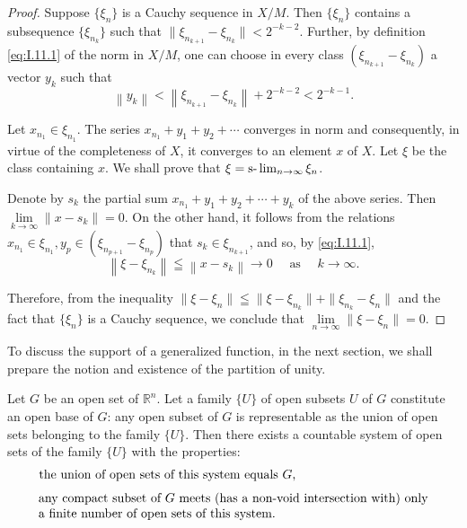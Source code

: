 \begin{proof}
 Suppose $\{\xi_n\}$ is a Cauchy sequence in $X / M$. Then $\{\xi_n\}$ contains a subsequence $\{\xi_{n_{k}}\}$ such that $\| \xi_{n_{k+1}}- \xi_{n_{k}} \| < 2^{-k-2}$. Further, by definition \eqref{eq:I.11.1} of the norm in $X / M$, one can choose in every class $(\xi_{n_{k+1}}- \xi_{n_{k}})$ a vector $y_k$ such that 
\[
\left\| y_{k} \right\| < \left\| \xi_ {n_{k+1}}- \xi_ {n_{k}} \right\| + 2 ^{-k-2} < 2 ^{-k-1}. \]

Let $x_{n_1} \in \xi_{n_1}$. The series $x_{n_1} + y_1 + y_2 + \cdots$ converges in norm and consequently, in virtue of the completeness of $X$, it converges to an element $x$ of $X$. Let $\xi$ be the class containing $x$. We shall prove that $\xi = \text{s-}\lim\nolimits_{n \to \infty} \xi_n$. 


Denote by $s_{k}$ the partial sum $x_{n_{1}} + y_{1} + y_{2} + \cdots + y_{k}$ of the above series. Then $\lim\limits_{k \to \infty} \|x- s_{k}\| = 0$. On the other hand, it follows from the relations $x_{n_{1}} \in \xi_{n_{1}}, y_{p} \in (\xi_{n_{p+1}}- \xi_{n_{p}})$ that $s_{k} \in \xi_{n_{k+1}}$, and so, by \eqref{eq:I.11.1}, 
\[
\left\| \xi- \xi_ {n_{k}} \right\| \leqq \left\| x- s_{k} \right\|\rightarrow 0 \quad \text{ as } \quad k \rightarrow \infty .
\]

Therefore, from the inequality $\|\xi- \xi_n\| \leqq \|\xi- \xi_{n_{k}}\| + \|\xi_{n_{k}}- \xi_n\|$ and the fact that $\{\xi_n\}$ is a Cauchy sequence, we conclude that $\lim\limits_{n \to \infty} \|\xi- \xi_n\| = 0$.
\end{proof}

\label{sec:I.12}

To discuss the support of a generalized function, in the next section, we shall prepare the notion and existence of the partition of unity. 

\begin{propositionu} Let $G$ be an open set of $\mathbb{R}^{n}$. Let a family $\{U\}$ of open subsets $U$ of $G$ constitute an open base of $G$: any open subset of $G$ is representable as the union of open sets belonging to the family $\{U\}$. Then there exists a countable system of open sets of the family $\{U\}$ with the properties: 
\begin{equation}\label{eq:I.12.1}
\parbox{0.90\linewidth}{the union of open sets of this system equals $G$,}
\end{equation}
\begin{equation}\label{eq:I.12.2}
\parbox{0.90\linewidth}{any compact subset of $G$ meets (has a non-void intersection with) only a finite number of open sets of this system.}
\end{equation}
\end{propositionu}

